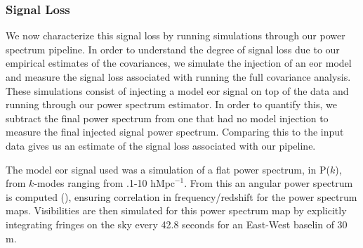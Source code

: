 \documentclass[twocolumn,numberedappendix]{emulateapj} \shorttitle{PSA64}
\begin{document}
\subsubsection{Signal Loss}
We now characterize this signal loss by running simulations through our power
spectrum pipeline.  In order to understand the degree of signal loss due to our
empirical estimates of the covariances, we simulate the injection of an eor
model and measure the signal loss associated with running the full covariance
analysis. These simulations consist of injecting a model eor signal on top of
the data and running through our power spectrum estimator. In order to
quantify this, we subtract the final power spectrum from one that had no model
injection to measure the final injected signal power spectrum. Comparing this to
the input data gives us an estimate of the signal loss associated with our
pipeline.

The model eor signal used was a simulation of a flat power spectrum, in P($k$),
from $k$-modes ranging from .1-10 $\text{hMpc}^{-1}$. From this an angular power
spectrum is computed (\cite{datta_et_al2007, lewis_challinor_2007}), ensuring
correlation in frequency/redshift for the power spectrum maps. Visibilities are
then simulated for this power spectrum map by explicitly integrating fringes on
the sky every 42.8 seconds for an East-West baselin of 30 m.
\end{document}
